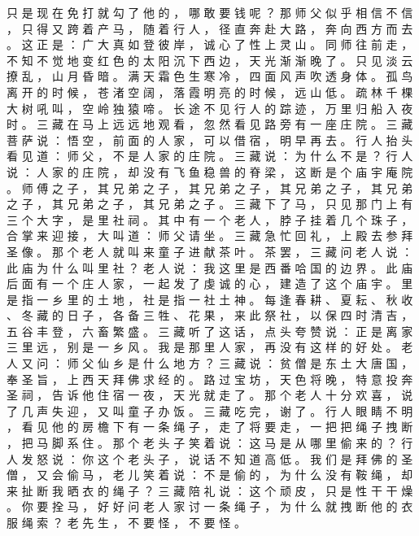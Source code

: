 {只 是 现 在 免 打 就 勾 了 他 的 ， 哪 敢 要 钱 呢 ？ 那 师 父 似 乎 相 信 不 信 ， 只 得 又 跨 着 产 马 ， 随 着 行 人 ， 径 直 奔 赴 大 路 ， 奔 向 西 方 而 去 。
这 正 是 ： 广 大 真 如 登 彼 岸 ， 诚 心 了 性 上 灵 山 。
同 师 往 前 走 ， 不 知 不 觉 地 变 红 色 的 太 阳 沉 下 西 边 ， 天 光 渐 渐 晚 了 。
只 见 淡 云 撩 乱 ， 山 月 昏 暗 。
满 天 霜 色 生 寒 冷 ， 四 面 风 声 吹 透 身 体 。
孤 鸟 离 开 的 时 候 ， 苍 渚 空 阔 ， 落 霞 明 亮 的 时 候 ， 远 山 低 。
疏 林 千 棵 大 树 吼 叫 ， 空 岭 独 猿 啼 。
长 途 不 见 行 人 的 踪 迹 ， 万 里 归 船 入 夜 时 。
三 藏 在 马 上 远 远 地 观 看 ， 忽 然 看 见 路 旁 有 一 座 庄 院 。
三 藏 菩 萨 说 ： 悟 空 ， 前 面 的 人 家 ， 可 以 借 宿 ， 明 早 再 去 。
行 人 抬 头 看 见 道 ： 师 父 ， 不 是 人 家 的 庄 院 。
三 藏 说 ： 为 什 么 不 是 ？ 行 人 说 ： 人 家 的 庄 院 ， 却 没 有 飞 鱼 稳 兽 的 脊 梁 ， 这 断 是 个 庙 宇 庵 院 。
师 傅 之 子 ， 其 兄 弟 之 子 ， 其 兄 弟 之 子 ， 其 兄 弟 之 子 ， 其 兄 弟 之 子 ， 其 兄 弟 之 子 ， 其 兄 弟 之 子 。
三 藏 下 了 马 ， 只 见 那 门 上 有 三 个 大 字 ， 是 里 社 祠 。
其 中 有 一 个 老 人 ， 脖 子 挂 着 几 个 珠 子 ， 合 掌 来 迎 接 ， 大 叫 道 ： 师 父 请 坐 。
三 藏 急 忙 回 礼 ， 上 殿 去 参 拜 圣 像 。
那 个 老 人 就 叫 来 童 子 进 献 茶 叶 。
茶 罢 ， 三 藏 问 老 人 说 ： 此 庙 为 什 么 叫 里 社 ？ 老 人 说 ： 我 这 里 是 西 番 哈 国 的 边 界 。
此 庙 后 面 有 一 个 庄 人 家 ， 一 起 发 了 虔 诚 的 心 ， 建 造 了 这 个 庙 宇 。
里 是 指 一 乡 里 的 土 地 ， 社 是 指 一 社 土 神 。
每 逢 春 耕 、 夏 耘 、 秋 收 、 冬 藏 的 日 子 ， 各 备 三 牲 、 花 果 ， 来 此 祭 社 ， 以 保 四 时 清 吉 ， 五 谷 丰 登 ， 六 畜 繁 盛 。
三 藏 听 了 这 话 ， 点 头 夸 赞 说 ： 正 是 离 家 三 里 远 ， 别 是 一 乡 风 。
我 是 那 里 人 家 ， 再 没 有 这 样 的 好 处 。
老 人 又 问 ： 师 父 仙 乡 是 什 么 地 方 ？ 三 藏 说 ： 贫 僧 是 东 土 大 唐 国 ， 奉 圣 旨 ， 上 西 天 拜 佛 求 经 的 。
路 过 宝 坊 ， 天 色 将 晚 ， 特 意 投 奔 圣 祠 ， 告 诉 他 住 宿 一 夜 ， 天 光 就 走 了 。
那 个 老 人 十 分 欢 喜 ， 说 了 几 声 失 迎 ， 又 叫 童 子 办 饭 。
三 藏 吃 完 ， 谢 了 。
行 人 眼 睛 不 明 ， 看 见 他 的 房 檐 下 有 一 条 绳 子 ， 走 了 将 要 走 ， 一 把 把 绳 子 拽 断 ， 把 马 脚 系 住 。
那 个 老 头 子 笑 着 说 ： 这 马 是 从 哪 里 偷 来 的 ？ 行 人 发 怒 说 ： 你 这 个 老 头 子 ， 说 话 不 知 道 高 低 。
我 们 是 拜 佛 的 圣 僧 ， 又 会 偷 马 ， 老 儿 笑 着 说 ： 不 是 偷 的 ， 为 什 么 没 有 鞍 绳 ， 却 来 扯 断 我 晒 衣 的 绳 子 ？ 三 藏 陪 礼 说 ： 这 个 顽 皮 ， 只 是 性 干 干 燥 。
你 要 拴 马 ， 好 好 问 老 人 家 讨 一 条 绳 子 ， 为 什 么 就 拽 断 他 的 衣 服 绳 索 ？ 老 先 生 ， 不 要 怪 ， 不 要 怪 。
}
